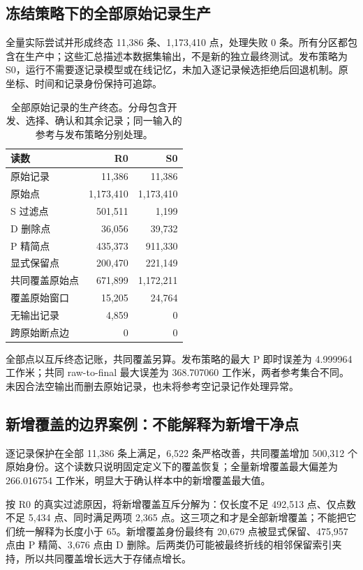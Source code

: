 \subsection{冻结策略下的全部原始记录生产}
全量实际尝试并形成终态 11,386 条、1,173,410 点，处理失败 0 条。所有分区都包含在生产中；这些汇总描述本数据集输出，不是新的独立最终测试。发布策略为 S0，运行不需要逐记录模型或在线记忆，未加入逐记录候选拒绝后回退机制。原坐标、时间和记录身份保持可追踪。

\begin{table}[H]\centering\small
\caption{全部原始记录的生产终态。分母包含开发、选择、确认和其余记录；同一输入的参考与发布策略分别处理。}
\begin{tabularx}{\linewidth}{@{}Yrr@{}}\toprule 读数 & R0 & S0 \\ \midrule
原始记录 & 11,386 & 11,386 \\
原始点 & 1,173,410 & 1,173,410 \\
S 过滤点 & 501,511 & 1,199 \\
D 删除点 & 36,056 & 39,732 \\
P 精简点 & 435,373 & 911,330 \\
显式保留点 & 200,470 & 221,149 \\
共同覆盖原始点 & 671,899 & 1,172,211 \\
覆盖原始窗口 & 15,205 & 24,764 \\
无输出记录 & 4,859 & 0 \\
跨原始断点边 & 0 & 0 \\
\bottomrule\end{tabularx}\end{table}

全部点以互斥终态记账，共同覆盖另算。发布策略的最大 P 即时误差为 4.999964 工作米；共同 raw-to-final 最大误差为 368.707060 工作米，两者参考集合不同。未因合法空输出而删去原始记录，也未将参考空记录记作处理异常。

\subsection{新增覆盖的边界案例：不能解释为新增干净点}
逐记录保护在全部 11,386 条上满足，6,522 条严格改善，共同覆盖增加 500,312 个原始身份。这个读数只说明固定定义下的覆盖恢复；全量新增覆盖最大偏差为 266.016754 工作米，明显大于确认样本中的新增覆盖最大值。

按 R0 的真实过滤原因，将新增覆盖互斥分解为：仅长度不足 492,513 点、仅点数不足 5,434 点、同时满足两项 2,365 点。这三项之和才是全部新增覆盖；不能把它们统一解释为长度小于 65。新增覆盖身份最终有 20,679 点被显式保留、475,957 点由 P 精简、3,676 点由 D 删除。后两类仍可能被最终折线的相邻保留索引夹持，所以共同覆盖增长远大于存储点增长。

